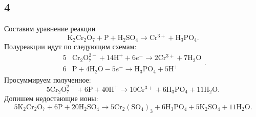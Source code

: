 \subsection{4}

Составим уравнение реакции
\[
\mathrm{K_2Cr_2O_7}+\mathrm{P}+\mathrm{H_2SO_4}\longrightarrow\mathrm{Cr^{3+}}+\mathrm{H_3PO_4}.
\]
Полуреакции идут по следующим схемам:
\[
\begin{array}{r|l}
	5 & \mathrm{Cr_2O_7^{2-}}+14\mathrm{H^+}+6e^-\longrightarrow2\mathrm{Cr^{3+}}+7\mathrm{H_2O} \\
	6 & \mathrm{P}+4\mathrm{H_2O}-5e^-\longrightarrow\mathrm{H_3PO_4}+5\mathrm{H^+}
\end{array}.
\]
Просуммируем полученное:
\[
5\mathrm{Cr_2O_7^{2-}}+6\mathrm{P}+40\mathrm{H^+}\longrightarrow10\mathrm{Cr^{3+}}+6\mathrm{H_3PO_4}+11\mathrm{H_2O}.
\]
Допишем недостающие ионы:
\[
5\mathrm{K_2Cr_2O_7}+6\mathrm{P}+20\mathrm{H_2SO_4}\longrightarrow5\mathrm{Cr_2(SO_4)_3}+6\mathrm{H_3PO_4}+\mathrm{5K_2SO_4}+11\mathrm{H_2O}.
\]